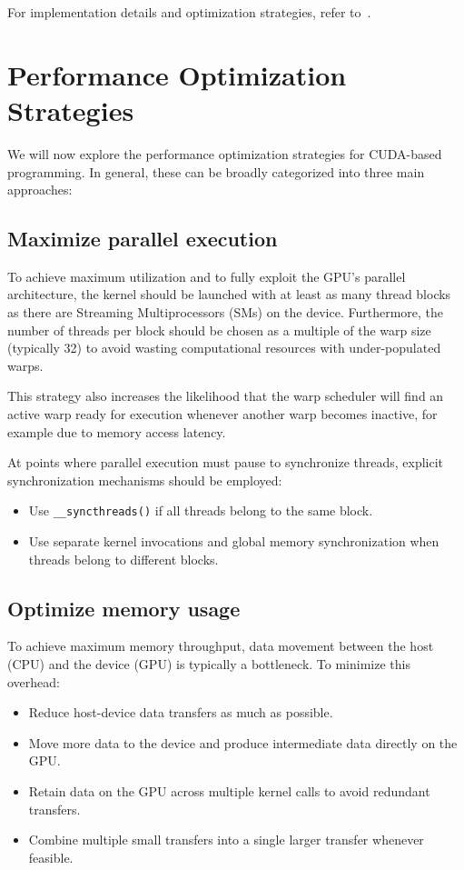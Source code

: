 \documentclass[12pt]{book}
\begin{document}
For implementation details and optimization strategies, refer to~\cite{nvidia2011nvidia}.

\section{Performance Optimization Strategies}

We will now explore the performance optimization strategies for CUDA-based programming. In general, these can be broadly categorized into three main approaches:

\subsection{Maximize parallel execution} 
     To achieve maximum utilization and to fully exploit the GPU's parallel architecture, the kernel should be launched with at least as many thread blocks as there are Streaming Multiprocessors (SMs) on the device. Furthermore, the number of threads per block should be chosen as a multiple of the warp size (typically 32) to avoid wasting computational resources with under-populated warps. 
    
    This strategy also increases the likelihood that the warp scheduler will find an active warp ready for execution whenever another warp becomes inactive, for example due to memory access latency. 
    
    At points where parallel execution must pause to synchronize threads, explicit synchronization mechanisms should be employed:
    \begin{itemize}
        \item Use \texttt{\_\_syncthreads()} if all threads belong to the same block.
        \item Use separate kernel invocations and global memory synchronization when threads belong to different blocks.
    \end{itemize}

    \subsection{Optimize memory usage} 
    To achieve maximum memory throughput, data movement between the host (CPU) and the device (GPU) is typically a bottleneck. To minimize this overhead:
    \begin{itemize}
        \item Reduce host-device data transfers as much as possible.
        \item Move more data to the device and produce intermediate data directly on the GPU.
        \item Retain data on the GPU across multiple kernel calls to avoid redundant transfers.
        \item Combine multiple small transfers into a single larger transfer whenever feasible.
    \end{itemize}
\end{document}
